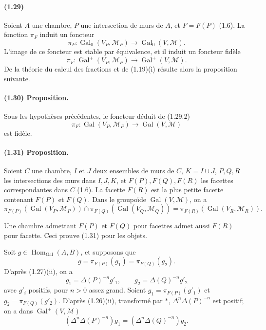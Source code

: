 \documentclass[10pt]{article}
\begin{document}
\paragraph{(1.29)} Soient \(A\) une chambre, \(P\) une intersection de murs de \(A\), et \(F=F(P)\) (1.6). La fonction \(\pi_F\) induit un foncteur
\[
\tag{1.29.1}
\pi_F:\operatorname{Gal}_0(V_P,\mathcal M_P)\longrightarrow\operatorname{Gal}_0(V,\mathcal M).
\]
L'image de ce foncteur est stable par équivalence, et il induit un foncteur fidèle
\[
\tag{1.29.2}
\pi_F:\operatorname{Gal}^+(V_P,\mathcal M_P)\longrightarrow\operatorname{Gal}^+(V,\mathcal M).
\]
De la théorie du calcul des fractions et de (1.19)(i) résulte alors la proposition suivante.

\paragraph{(1.30) Proposition.} Sous les hypothèses précédentes, le foncteur déduit de (1.29.2)
\[
\pi_F:\operatorname{Gal}(V_P,\mathcal M_P)\longrightarrow\operatorname{Gal}(V,\mathcal M)
\]
est fidèle.

\paragraph{(1.31) Proposition.} Soient \(C\) une chambre, \(I\) et \(J\) deux ensembles de murs de \(C\), \(K=I\cup J\), \(P,Q,R\) les intersections des murs dans \(I,J,K\), et \(F(P),F(Q),F(R)\) les facettes correspondantes dans \(C\) (1.6). La facette \(F(R)\) est la plus petite facette contenant \(F(P)\) et \(F(Q)\). Dans le groupoïde \(\operatorname{Gal}(V,\mathcal M)\), on a
\[
\pi_{F(P)}(\operatorname{Gal}(V_P,\mathcal M_P))\cap
\pi_{F(Q)}(\operatorname{Gal}(V_Q,\mathcal M_Q))
=
\pi_{F(R)}(\operatorname{Gal}(V_R,\mathcal M_R)).
\]

Une chambre admettant \(F(P)\) et \(F(Q)\) pour facettes admet aussi \(F(R)\) pour facette. Ceci prouve (1.31) pour les objets.

Soit \(g\in\operatorname{Hom}_{\operatorname{Gal}}(A,B)\), et supposons que
\[
g=\pi_{F(P)}(g_1)=\pi_{F(Q)}(g_2).
\]
D'après (1.27)(ii), on a
\[
g_1=\Delta(P)^{-n}g'_1,\qquad
g_2=\Delta(Q)^{-n}g'_2
\]
avec \(g'_i\) positifs, pour \(n>0\) assez grand. Soient \(g_1=\pi_{F(P)}(g'_1)\) et \(g_2=\pi_{F(Q)}(g'_2)\). D'après (1.26)(ii), transformé par \(*\), \(\Delta^n\Delta(P)^{-n}\) est positif; on a dans \(\operatorname{Gal}^+(V,\mathcal M)\)
\[
\tag{1.31.1}
(\Delta^n\Delta(P)^{-n})g_1=(\Delta^n\Delta(Q)^{-n})g_2.
\]
\end{document}
